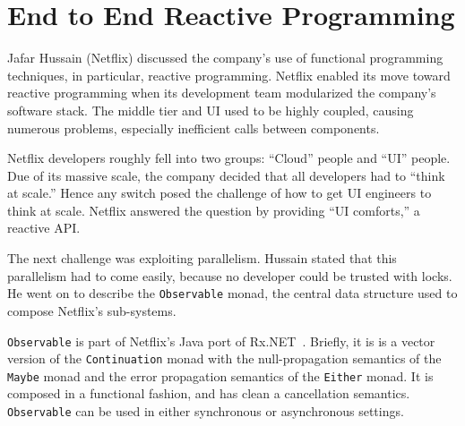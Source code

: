 \documentclass{jfp1}
\begin{document}






\section{End to End Reactive Programming}


Jafar Hussain (Netflix) discussed the company's use of functional
programming techniques, in particular, reactive programming. Netflix
enabled its move toward reactive programming when its development team
modularized the company's software stack. The middle tier and UI used to
be highly coupled, causing numerous problems, especially inefficient calls
between components.

Netflix developers roughly fell into two groups: ``Cloud'' people and
``UI'' people. Due of its massive scale, the company decided that all
developers had to ``think at scale.'' Hence any switch posed the challenge
of how to get UI engineers to think at scale. Netflix answered the
question by providing ``UI comforts,'' a reactive API. 

The next challenge was exploiting parallelism.  Hussain stated that this
parallelism had to come easily, because no developer could be trusted with
locks. He went on to describe the \texttt{Observable} monad, the central
data structure used to compose Netflix's sub-systems. 

{\tt Observable} is part of Netflix's Java port of
Rx.NET~\cite{Christensen:2013:Reactive}. Briefly, it is is a vector
version of the {\tt Continuation} monad with the null-propagation
semantics of the {\tt Maybe} monad and the error propagation semantics of
the {\tt Either} monad. It is composed in a functional fashion, and has
clean a cancellation semantics. \texttt{Observable} can be used in either
synchronous or asynchronous settings.
\end{document}
